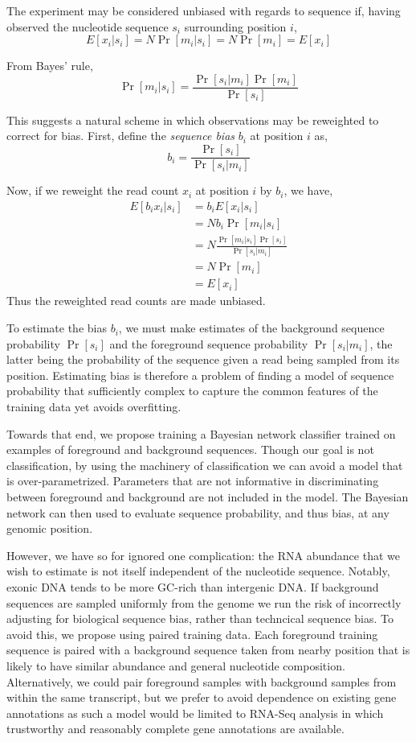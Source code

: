 \documentclass{bioinfo}
\begin{document}
The experiment may be considered unbiased  with regards to sequence if, having
observed the nucleotide sequence $s_i$ surrounding position $i$,
$$ E[ x_i | s_i ] = N \Pr[ m_i | s_i ] = N \Pr[ m_i ] = E[ x_i ] $$

From Bayes' rule,
$$ \Pr[ m_i | s_i ] = \frac{ \Pr[ s_i | m_i ] \Pr[ m_i ] }{ \Pr[ s_i ] } $$

This suggests a natural scheme in which observations may be reweighted to
correct for bias.  First, define the \emph{sequence bias} $b_i$ at position $i$
as,
$$ b_i = \frac{ \Pr[ s_i ] } { \Pr[ s_i | m_i ] } $$

Now, if we reweight the read count $x_i$ at position $i$ by $b_i$, we
have,
\begin{align*}
E[ b_i x_i | s_i ] &= b_i E[ x_i | s_i ] \\
&= N b_i \Pr[ m_i | s_i ] \\
&= N \frac{ \Pr[ m_i | s_i ] \Pr[ s_i ] }{ \Pr[ s_i | m_i ] } \\
&= N \Pr[ m_i ] \\
&= E[ x_i ]
\end{align*}
Thus the reweighted read counts are made unbiased.

To estimate the bias $b_i$, we must make estimates of the background sequence
probability $\Pr[s_i]$ and the foreground sequence probability $\Pr[ s_i | m_i
]$, the latter being the probability of the sequence given a read being sampled
from its position. Estimating bias is therefore a problem of finding a model of
sequence probability that sufficiently complex to capture the common features of
the training data yet avoids overfitting.

Towards that end, we propose training a Bayesian network classifier trained on
examples of foreground and background sequences. Though our goal is not
classification, by using the machinery of classification we can avoid a model
that is over-parametrized. Parameters that are not informative in
discriminating between foreground and background are not included in the model.
The Bayesian network can then used to evaluate sequence probability, and thus
bias, at any genomic position.

However, we have so for ignored one complication: the RNA abundance that we wish
to estimate is not itself independent of the nucleotide sequence. Notably,
exonic DNA tends to be more GC-rich than intergenic DNA. If background sequences
are sampled uniformly from the genome we run the risk of incorrectly adjusting
for biological sequence bias, rather than techncical sequence bias.  To avoid
this, we propose using paired training data. Each foreground training
sequence is paired with a background sequence taken from nearby position
that is likely to have similar abundance and general nucleotide composition.
Alternatively, we could pair foreground samples with background samples from
within the same transcript, but we prefer to avoid dependence on existing
gene annotations as such a model would be limited to RNA-Seq analysis in which
trustworthy and reasonably complete gene annotations are available.
\end{document}
